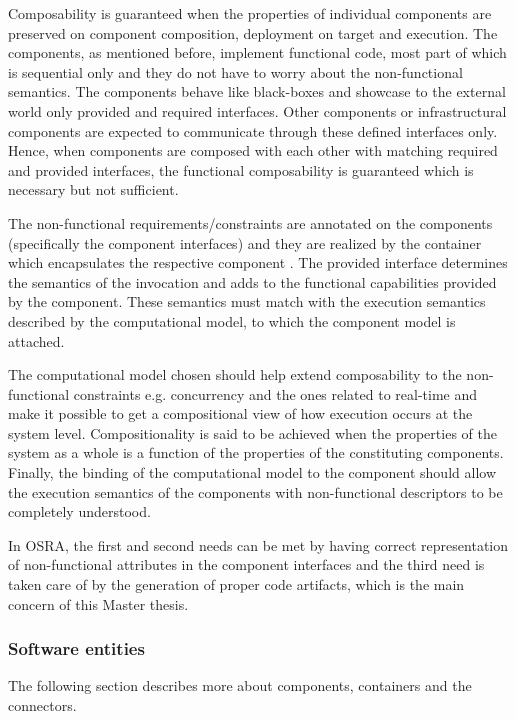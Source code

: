 \begin{description}
Composability is guaranteed when the properties of individual components are preserved on component composition, deployment on target and execution. The components, as mentioned before, implement functional code, most part of which is sequential only and they do not have to worry about the non-functional semantics. The components behave like black-boxes and showcase to the external world only provided and required interfaces. Other components or infrastructural components are expected to communicate through these defined interfaces only. Hence, when components are composed with each other with matching required and provided interfaces, the functional composability is guaranteed which is necessary but not sufficient.

The non-functional requirements/constraints are annotated on the components (specifically the component interfaces) and they are realized by the container which encapsulates the respective component \cite{SAVOIR,ComponentModel}. The provided interface determines the semantics of the invocation and adds to the functional capabilities provided by the component. These semantics must match with the execution semantics described by the computational model, to which the component model is attached.

The computational model chosen should help extend composability to the non-functional constraints e.g. concurrency and the ones related to real-time and make it possible to get a compositional view of how execution occurs at the system level. Compositionality is said to be achieved when the properties of the system as a whole is a function of the properties of the constituting components. Finally, the binding of the computational model to the component should allow the execution semantics of the components with non-functional descriptors to be completely understood.

In OSRA, the first and second needs can be met by having correct representation of non-functional attributes in the component interfaces and the third need is taken care of by the generation of proper code artifacts, which is the main concern of this Master thesis.     
\end{description}

\subsubsection{\textbf{Software entities}}
\label {section: Software entities}
The following section describes more about components, containers and the connectors.

